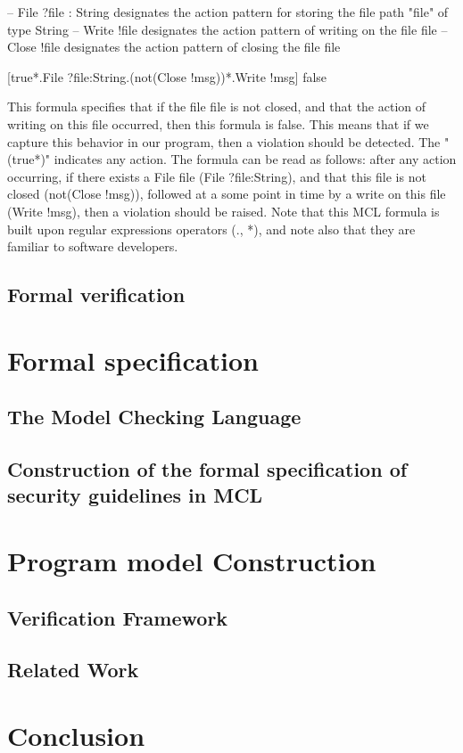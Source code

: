 \documentclass[10pt]{article}
\begin{document}
– {File ?file : String} designates the action pattern for storing the file path "file"
of type String
– {Write !file} designates the action pattern of writing on the file file
– {Close !file} designates the action pattern of closing the file file

[true*.{File ?file:String}.(not({Close !msg}))*.{Write !msg}] false

This formula specifies that if the file file is not closed, and that the action of writing on
this file occurred, then this formula is false. This means that if we capture this behavior
in our program, then a violation should be detected. The "(true*)" indicates any action.
The formula can be read as follows: after any action occurring, if there exists a File file
(File ?file:String), and that this file is not closed (not(Close !msg)), followed at a some
point in time by a write on this file (Write !msg), then a violation should be raised.
Note that this MCL formula is built upon regular expressions operators (., *), and note
also that they are familiar to software developers.

\subsection {Formal verification}
\section{Formal specification}
\subsection {The Model Checking Language}
\subsection {Construction of the formal specification of security guidelines in MCL}
\section{Program model Construction}
\subsection {Verification Framework}
\subsection {Related Work}
\section{Conclusion}
\end{document}

